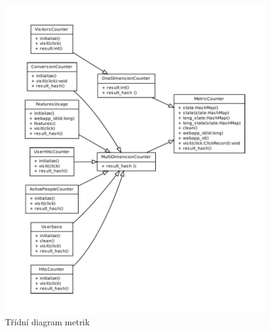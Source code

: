 \documentclass[bc,male,java,dept456]{diploma}						%
\begin{document}
\begin{figure}[h]
	\includegraphics[width=15.25cm]{img/code/MetricCounter.pdf}
	\caption{Třídní diagram metrik}
	\label{img:metric_counter}
\end{figure}
\end{document}

